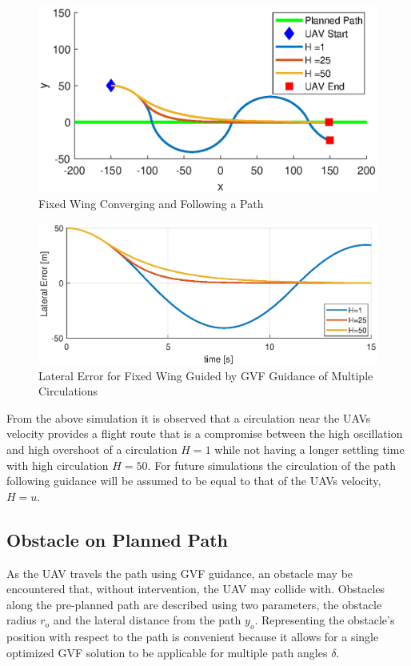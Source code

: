 \documentclass[numbered,pdftex]{ohio-etd}
\begin{document}
\begin{figure}[H]
	\centering
	\includegraphics[trim=0 30 0 65,clip,width=14cm]{PaperFigures/Methods/pathMultipleHs}
	\caption{Fixed Wing Converging and Following a Path}
	\label{fig:uavPathMultipleHs}
\end{figure}


\begin{figure}[H]
	\centering
	\includegraphics[trim=0 0 0 0,clip,width=16cm]{PaperFigures/Methods/lateralErrorVsTime}
	\caption{Lateral Error for Fixed Wing Guided by GVF Guidance of Multiple Circulations}
	\label{fig:uavPathMultipleHsLateral}
\end{figure}

From the above simulation it is observed that a circulation near the UAVs velocity provides a flight route that is a compromise between the high oscillation and high overshoot of a circulation $H=1$ while not having a longer settling time with high circulation $H=50$. For future simulations the circulation of the path following guidance will be assumed to be equal to that of the UAVs velocity, $H=u$. \\

\subsection{Obstacle on Planned Path}
As the UAV travels the path using GVF guidance, an obstacle may be encountered that, without intervention, the UAV may collide with. Obstacles along the pre-planned path are described using two parameters, the obstacle radius $r_o$ and the lateral distance from the path $y_o$. Representing the obstacle's position with respect to the path is convenient because it allows for a single optimized GVF solution to be applicable for multiple path angles $\delta$.
\end{document}
